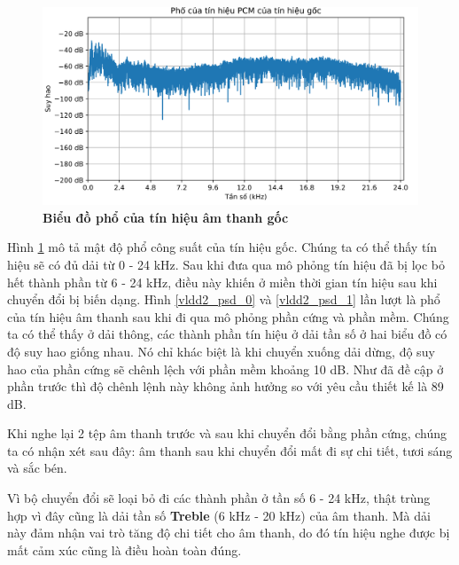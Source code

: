 \begin{figure}[H]
    \centering
    \includegraphics[width=14cm]{Images/Chuong4/tb/wav/vldd2_psd_2.png}
    \caption[Biểu đồ phổ của tín hiệu âm thanh gốc]{\bfseries \fontsize{12pt}{0pt}\selectfont Biểu đồ phổ của tín hiệu âm thanh gốc}
    \label{vldd2_psd_2}
\end{figure}



Hình \ref{vldd2_psd_2} mô tả mật độ phổ công suất của tín hiệu gốc. Chúng ta có thể thấy tín hiệu sẽ có đủ dải từ 0 - 24 kHz. Sau khi đưa qua mô phỏng tín hiệu đã bị lọc bỏ hết thành phần từ 6 - 24 kHz, điều này khiến ở miền thời gian tín hiệu sau khi chuyển đổi bị biến dạng. Hình \ref{vldd2_psd_0} và \ref{vldd2_psd_1} lần lượt là phổ của tín hiệu âm thanh sau khi đi qua mô phỏng phần cứng và phần mềm. Chúng ta có thể thấy ở dải thông, các thành phần tín hiệu ở dải tần số ở hai biểu đồ có độ suy hao giống nhau. Nó chỉ khác biệt là khi chuyển xuống dải dừng, độ suy hao của phần cứng sẽ chênh lệch với phần mềm khoảng 10 dB. Như đã đề cập ở phần trước thì độ chênh lệnh này không ảnh hưởng so với yêu cầu thiết kế là 89 dB.

Khi nghe lại 2 tệp âm thanh trước và sau khi chuyển đổi bằng phần cứng, chúng ta có nhận xét sau đây: âm thanh sau khi chuyển đổi mất đi sự chi tiết, tươi sáng và sắc bén.

Vì bộ chuyển đổi sẽ loại bỏ đi các thành phần ở tần số 6 - 24 kHz, thật trùng hợp vì đây cũng là dải tần số \textbf{Treble} (6 kHz - 20 kHz) của âm thanh. Mà dải này đảm nhận vai trò tăng độ chi tiết cho âm thanh, do đó tín hiệu nghe được bị mất cảm xúc cũng là điều hoàn toàn đúng.

